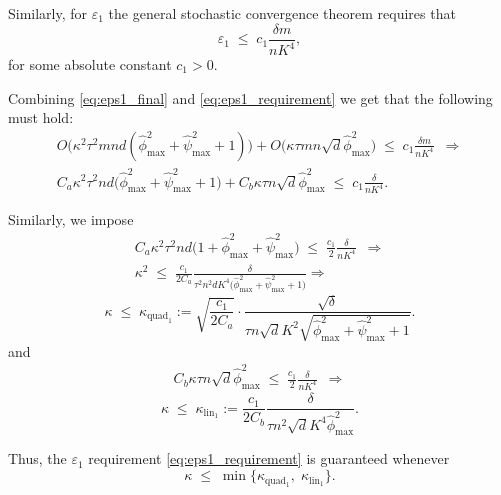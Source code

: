 \documentclass[10pt]{article} %
\theoremstyle{definition}
\theoremstyle{plain}
\begin{document}
Similarly, for $\varepsilon_1$ the general stochastic convergence theorem requires that
\[
\varepsilon_1
\;\le\;
c_1 \frac{\delta m}{nK^4},
\tag{4}
\label{eq:eps1_requirement}
\]
for some absolute constant $c_1>0$.

Combining \eqref{eq:eps1_final} and \eqref{eq:eps1_requirement} we get that the following must hold:
\begin{align*}
\label{eq:eps1_req_expanded}
O\big(\kappa^2\tau^2 m n d(\hat\phi_{\max}^2 + \hat\psi_{\max}^2 +1)\big)+ O\big(\kappa\tau m n \sqrt{d}  \hat\phi_{\max}^2\big) \;\le\;
c_1 \frac{\delta m}{nK^4} \enspace \Rightarrow \\
C_a \kappa^2 \tau^2 n d\bigl(\hat\phi_{\max}^2 + \hat\psi_{\max}^2+1 \bigr)
+
C_b \kappa \tau n \sqrt{d} \hat\phi_{\max}^2
\;\le\;
c_1 \frac{\delta}{nK^4}.
\end{align*}

Similarly, we impose
\begin{align*}
C_a \kappa^2 \tau^2 n d\bigl(1 + \hat\phi_{\max}^2 + \hat\psi_{\max}^2\bigr)
\;\le\;
\frac{c_1}{2} \frac{\delta}{nK^4} \enspace \Rightarrow \\
\kappa^2
\;\le\;
\frac{c_1}{2C_a} 
\frac{\delta}
     {\tau^2 n^2 d K^4\bigl(\hat\phi_{\max}^2 + \hat\psi_{\max}^2 +1 \bigr)} \Rightarrow
\end{align*}
\begin{equation}
\label{eq:kappa_from_eps1_quad}
\kappa
\;\le\;
\kappa_{\mathrm{quad}_1}
:=
\sqrt{\frac{c_1}{2C_a}}\cdot
\frac{\sqrt{\delta}}
     {\tau n \sqrt{d} K^2 \sqrt{\hat\phi_{\max}^2 + \hat\psi_{\max}^2+1}}.
\end{equation}
and
\begin{align*}
C_b \kappa \tau n \sqrt{d} \hat\phi_{\max}^2
\;\le\;
\frac{c_1}{2} \frac{\delta}{nK^4} \enspace \Rightarrow
\end{align*}
\begin{equation}
\label{eq:kappa_from_eps1_lin}
\kappa
\;\le\;
\kappa_{\mathrm{lin_1}}
:=
\frac{c_1}{2C_b} 
\frac{\delta}
     {\tau n^2 \sqrt{d} K^4 \hat\phi_{\max}^2}.
\end{equation}

Thus, the $\varepsilon_1$ requirement
\eqref{eq:eps1_requirement} is guaranteed whenever
\[
\kappa
\;\le\;
\min\bigl\{\kappa_{\mathrm{quad}_1},\;\kappa_{\mathrm{lin}_1}\bigr\}.
\]
\end{document}

